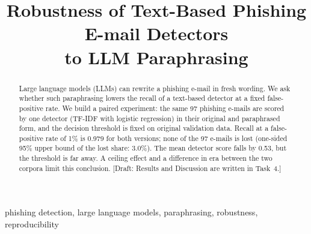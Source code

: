 \documentclass[conference]{IEEEtran}
\begin{document}
\title{Robustness of Text-Based Phishing E-mail Detectors\\to LLM Paraphrasing}

\author{
\and
{}
}

\maketitle

\begin{abstract}
Large language models (LLMs) can rewrite a phishing e-mail in fresh wording. We ask whether such paraphrasing lowers the recall of a text-based detector at a fixed false-positive rate. We build a paired experiment: the same 97 phishing e-mails are scored by one detector (TF-IDF with logistic regression) in their original and paraphrased form, and the decision threshold is fixed on original validation data. Recall at a false-positive rate of 1\% is 0.979 for both versions; none of the 97 e-mails is lost (one-sided 95\% upper bound of the lost share: 3.0\%). The mean detector score falls by 0.53, but the threshold is far away. A ceiling effect and a difference in era between the two corpora limit this conclusion. [Draft: Results and Discussion are written in Task~4.]
\end{abstract}

\begin{IEEEkeywords}
phishing detection, large language models, paraphrasing, robustness, reproducibility
\end{IEEEkeywords}









\end{document}
